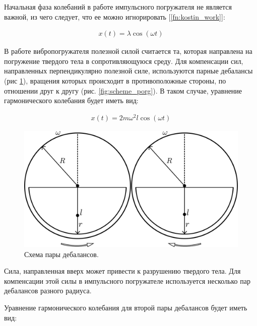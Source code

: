 Начальная фаза колебаний в работе импульсного погружателя не является важной, из чего следует, что ее можно игнорировать [\ref{fn:kostin_work}]:


\begin{equation}\label{eq:harmonic_notphi}
    \begin{aligned}
        x(t) = \lambda \cos (\omega t)
    \end{aligned}
\end{equation}

В работе вибропогружателя полезной силой считается та, которая направлена на погружение твердого тела в сопротивляющуюся среду. Для компенсации сил, направленных перпендикулярно полезной силе, используются парные дебалансы (рис \ref{fig:double_debalance}), вращения которых происходит в противоположные стороны, по отношении друг к другу (рис. \ref{fig:scheme_porg}). В таком случае, уравнение гармонического колебания будет иметь вид:

\begin{equation}\label{eq:harmonic_dual}
    \begin{aligned}
        x(t) = 2 m \omega^2 l \cos (\omega t)
    \end{aligned}
\end{equation}


\begin{figure}[h]
    \centering
    \includegraphics[width=0.8\linewidth]{img/double_debalance.png}
    \caption{Схема пары дебалансов.}
    \label{fig:double_debalance}
\end{figure}

Сила, направленная вверх может привести к разрушению твердого тела. Для компенсации этой силы в импульсного погружателе используется несколько пар дебалансов разного радиуса.

Уравнение гармонического колебания для второй пары дебалансов будет иметь вид:

